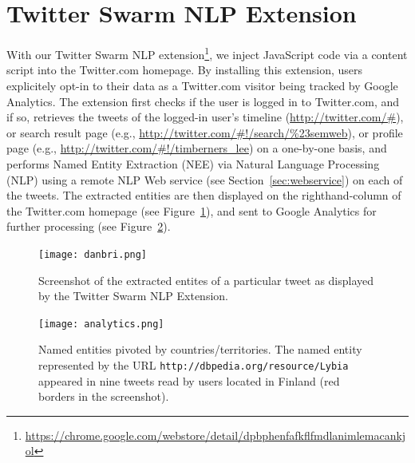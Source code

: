 \documentclass[runningheads,a4paper]{llncs}
\begin{document}
\section{Twitter Swarm NLP Extension}\label{sec:twitterswarm}
With our Twitter Swarm NLP extension\footnote{\url{https://chrome.google.com/webstore/detail/dpbphenfafkflfmdlanimlemacankjol}}, we inject JavaScript code via a content script into the Twitter.com homepage. By installing this extension, users explicitely opt-in to their data as a Twitter.com visitor being tracked by Google Analytics. The extension first checks if the user is logged in to Twitter.com, and if so, retrieves the tweets of the logged-in user's timeline (\url{http://twitter.com/#}), or search result page (e.g., \url{http://twitter.com/#!/search/%23semweb}), or profile page (e.g., \url{http://twitter.com/#!/timberners_lee}) on a one-by-one basis, and performs Named Entity Extraction (NEE) via Natural Language Processing (NLP) using a remote NLP Web service (see Section~\ref{sec:webservice}) on each of the tweets. The extracted entities are then displayed on the righthand-column of the Twitter.com homepage (see Figure~\ref{fig:danbri}), and sent to Google Analytics for further processing (see Figure~\ref{fig:analytics}).

\begin{figure}[h!]
  \centering
  \texttt{[image: danbri.png]}
  \caption{Screenshot of the extracted entites of a particular tweet as displayed by the Twitter Swarm NLP Extension.}
  \label{fig:danbri}
\end{figure}

\begin{figure}[h!]
  \centering
  \texttt{[image: analytics.png]}
  \caption{Named entities pivoted by countries/territories. The named entity represented by the URL \texttt{http://dbpedia.org/resource/Lybia} appeared in nine tweets read by users located in Finland (red borders in the screenshot).}
  \label{fig:analytics}
\end{figure}
\end{document}
